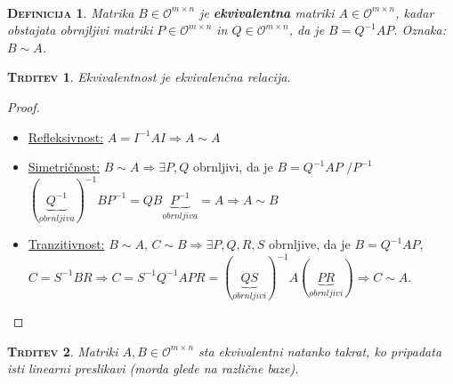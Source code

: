 \documentclass[a4paper,12pt]{article}
\newcommand{\OO}{\mathcal{O}}
\newtheorem*{trditev}{\textsc{Trditev}}
\newtheorem*{definicija}{\textsc{Definicija}}
\begin{document}
~ \\
\begin{definicija}
	Matrika $B\in \OO^{m\times n}$ je \textbf{ekvivalentna} matriki $A\in \OO^{m\times n}$, kadar obstajata obrnjljivi matriki $P\in \OO^{m\times n}$ in $Q\in \OO^{m\times n}$, da je $B=Q^{-1}AP$. Oznaka: $B \sim A$. \\
\end{definicija}

\newpage 

\begin{trditev}
	Ekvivalentnost je ekvivalenčna relacija. \\
\end{trditev}

\begin{proof}~
	\begin{itemize}
	\item \underline{Refleksivnost:} $A=I^{-1}AI\Rightarrow A\sim A$
	\item \underline{Simetričnost:} $B\sim A \Rightarrow \exists P,Q$ obrnljivi, da je $B=Q^{-1}AP$ $/ P^{-1}$ \\
	$(\underbrace{Q^{-1}}_{obrnljiva})^{-1}BP^{-1}=QB\underbrace{P^{-1}}_{obrnljiva}=A \Rightarrow A \sim B $
	\item \underline{Tranzitivnost:} $B\sim A$, $C\sim B \Rightarrow \exists P,Q,R,S$ obrnljive, da je $B=Q^{-1}AP$, \linebreak $C=S^{-1}BR \Rightarrow  C=S^{-1}Q^{-1}APR=(\underbrace{QS}_{obrnljivi})^{-1}A(\underbrace{PR}_{obrnljivi})\Rightarrow C\sim A$. \\
	\end{itemize}
\end{proof}

\begin{trditev}
	Matriki $A,B\in \OO^{m\times n}$ sta ekvivalentni natanko takrat, ko pripadata isti linearni preslikavi (morda glede na različne baze). \\
\end{trditev}
\end{document}
